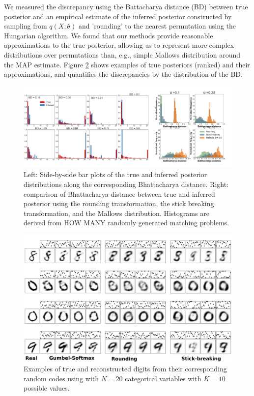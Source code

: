  We measured the discrepancy using the Battacharya distance (BD)
 between true posterior and an empirical estimate of the inferred
 posterior constructed by sampling from $q(X; \theta)$ and 'rounding'
 to the nearest permutation using the Hungarian algorithm. We found
 that our methods provide reasonable approximations to the true
 posterior, allowing us to represent more complex distributions over
 permutations than, e.g., simple Mallows distribution around the MAP
 estimate. Figure \ref{fig:synthetic} shows
 examples of true posteriors (ranked) and their approximations, and
 quantifies the discrepancies by the distribution of the BD.

 \begin{figure}[t] 
   \centering
   \includegraphics[width=1.0\textwidth]{../figures/figure5.pdf}
   \caption{Left: Side-by-side bar plots of the true and inferred
     posterior distributions along the corresponding Bhattacharya distance.
     Right: comparison of Bhattacharya distance between true and inferred
   posterior using the rounding transformation, the stick breaking transformation, and the Mallows distribution.  Histograms are derived from HOW MANY randomly generated matching problems.  }
\label{fig:VAE}
\end{figure}

\label{sec:synthetic}


\begin{figure}[t]
  \centering
  \includegraphics[width=5.in]{../figures/figure4.pdf} 
  \caption{Examples of true and reconstructed digits from their corresponding random codes using with $N=20$ categorical variables with $K=10$ possible values.
  }
\label{fig:synthetic}
\end{figure}

